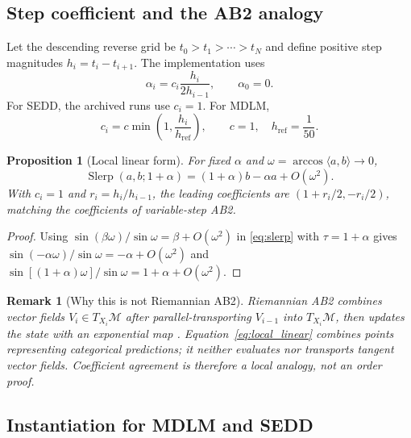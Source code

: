 \documentclass[10pt]{article}
\newtheorem{proposition}{Proposition}
\newtheorem{remark}{Remark}
\newcommand{\Slerp}{\operatorname{Slerp}}
\begin{document}
\subsection{Step coefficient and the AB2 analogy}

Let the descending reverse grid be $t_0>t_1>\cdots>t_N$ and define positive step magnitudes
$h_i=t_i-t_{i+1}$.  The implementation uses
\begin{equation}
  \alpha_i=c_i\frac{h_i}{2h_{i-1}},\qquad \alpha_0=0.
  \label{eq:alpha}
\end{equation}
For SEDD, the archived runs use $c_i=1$.  For MDLM,
\begin{equation}
  c_i=c\min\left(1,\frac{h_i}{h_{\mathrm{ref}}}\right),
  \qquad c=1,\quad h_{\mathrm{ref}}=\frac{1}{50}.
  \label{eq:dynamic_damping}
\end{equation}

\begin{proposition}[Local linear form]
For fixed $\alpha$ and $\omega=\arccos\langle a,b\rangle\rightarrow0$,
\begin{equation}
  \Slerp(a,b;1+\alpha)
  =(1+\alpha)b-\alpha a+O(\omega^2).
  \label{eq:local_linear}
\end{equation}
With $c_i=1$ and $r_i=h_i/h_{i-1}$, the leading coefficients are
$(1+r_i/2,-r_i/2)$, matching the coefficients of variable-step AB2.
\end{proposition}

\begin{proof}
Using $\sin(\beta\omega)/\sin\omega=\beta+O(\omega^2)$ in
\cref{eq:slerp} with $\tau=1+\alpha$ gives
$\sin(-\alpha\omega)/\sin\omega=-\alpha+O(\omega^2)$ and
$\sin[(1+\alpha)\omega]/\sin\omega=1+\alpha+O(\omega^2)$.
\end{proof}

\begin{remark}[Why this is not Riemannian AB2]
Riemannian AB2 combines vector fields $V_i\in T_{X_i}\mathcal{M}$ after parallel-transporting
$V_{i-1}$ into $T_{X_i}\mathcal{M}$, then updates the state with an exponential map
\citep{hairer2006geometric}.  Equation~\eqref{eq:local_linear} combines \emph{points representing
categorical predictions}; it neither evaluates nor transports tangent vector fields.  Coefficient
agreement is therefore a local analogy, not an order proof.
\end{remark}

\subsection{Instantiation for MDLM and SEDD}
\end{document}
